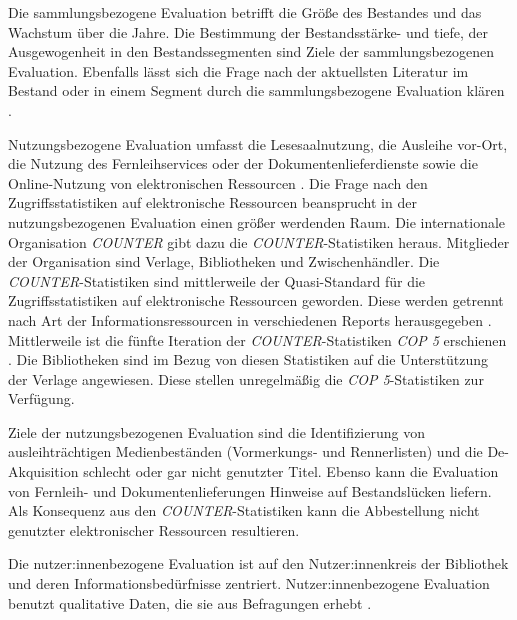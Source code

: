 Die sammlungsbezogene Evaluation betrifft die Größe des Bestandes und das Wachstum über die Jahre. Die Bestimmung der Bestandsstärke- und tiefe, 
der Ausgewogenheit in den Bestandssegmenten sind Ziele der sammlungsbezogenen Evaluation. 
Ebenfalls lässt sich die Frage nach der aktuellsten Literatur im Bestand oder in einem Segment durch die sammlungsbezogene Evaluation klären
\cite[vgl.][48 f.]{lyons_lucy_eleonore_collection_2010}.

Nutzungsbezogene Evaluation umfasst die Lesesaalnutzung, die Ausleihe vor-Ort, die Nutzung des Fernleihservices oder der Dokumentenlieferdienste 
sowie die Online-Nutzung von elektronischen Ressourcen \cite[vgl.][254 ff.]{johannsen_jochen_bestands-_2015}.
Die Frage nach den Zugriffsstatistiken auf elektronische Ressourcen beansprucht in der nutzungsbezogenen Evaluation einen größer werdenden Raum.
Die internationale Organisation \textit{\acrfull{COUNTER}} gibt dazu die \textit{\acrshort{COUNTER}}-Statistiken heraus. Mitglieder der Organisation sind Verlage, Bibliotheken
und Zwischenhändler. Die \textit{\acrshort{COUNTER}}-Statistiken sind mittlerweile der Quasi-Standard für die Zugriffsstatistiken 
auf elektronische Ressourcen geworden. Diese werden getrennt nach Art der Informationsressourcen in verschiedenen Reports herausgegeben \cite[vgl.][260 ff.]{johannsen_jochen_bestands-_2015}. 
Mittlerweile ist die fünfte Iteration der \textit{\acrshort{COUNTER}}-Statistiken \textit{\acrshort{COP 5}} erschienen \cite[vgl.][]{counter_abstract_2020}.
Die Bibliotheken sind im Bezug von diesen Statistiken auf die Unterstützung der Verlage angewiesen. Diese stellen unregelmäßig die \textit{\acrshort{COP 5}}-Statistiken zur
Verfügung. 

Ziele der nutzungsbezogenen Evaluation sind die Identifizierung von ausleihträchtigen Medienbeständen (Vormerkungs- und Rennerlisten) und
die De-Akquisition schlecht oder gar nicht genutzter Titel. Ebenso kann die Evaluation von Fernleih- und Dokumentenlieferungen Hinweise auf Bestandslücken liefern.
Als Konsequenz aus den \textit{\acrshort{COUNTER}}-Statistiken kann die Abbestellung nicht genutzter elektronischer Ressourcen resultieren.

Die nutzer:innenbezogene Evaluation ist auf den Nutzer:innenkreis der Bibliothek und deren Informationsbedürfnisse zentriert. 
Nutzer:innenbezogene Evaluation benutzt qualitative Daten, die sie aus Befragungen erhebt
\cites[vgl.][255 ff.]{johannsen_jochen_bestands-_2015}[vgl.][302]{johnson_peggy_fundamentals_2014}.

